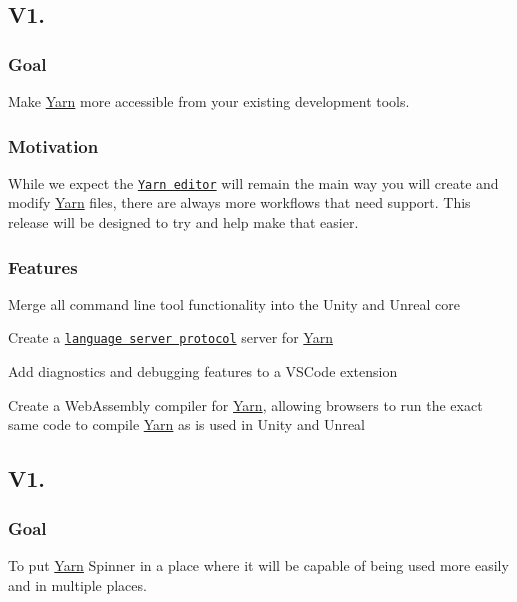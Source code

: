 \subsection*{V1.}

\subsubsection*{Goal}

Make \hyperlink{a00050}{Yarn} more accessible from your existing development tools.

\subsubsection*{Motivation}

While we expect the \href{https://github.com/YarnSpinnerTool/YarnEditor}{\tt Yarn editor} will remain the main way you will create and modify \hyperlink{a00050}{Yarn} files, there are always more workflows that need support. This release will be designed to try and help make that easier.

\subsubsection*{Features}


\begin{DoxyItemize}
\item Merge all command line tool functionality into the Unity and Unreal core
\item Create a \href{https://microsoft.github.io/language-server-protocol/}{\tt language server protocol} server for \hyperlink{a00050}{Yarn}
\item Add diagnostics and debugging features to a V\-S\-Code extension
\item Create a Web\-Assembly compiler for \hyperlink{a00050}{Yarn}, allowing browsers to run the exact same code to compile \hyperlink{a00050}{Yarn} as is used in Unity and Unreal
\end{DoxyItemize}

\subsection*{V1.}

\subsubsection*{Goal}

To put \hyperlink{a00050}{Yarn} Spinner in a place where it will be capable of being used more easily and in multiple places.

